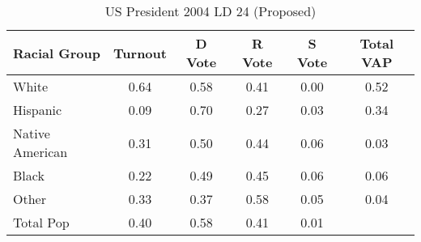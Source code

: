 \begin{table}[htb]
\begin{center}
\caption{US President 2004 LD 24 (Proposed)}
\label{pres04_vap_ld_24}
\begin{tabular}{lccccc}
  \hline
Racial Group & Turnout & D Vote & R Vote & S Vote & Total VAP \\ 
  \hline
White & 0.64 & 0.58 & 0.41 & 0.00 & 0.52 \\ 
  Hispanic & 0.09 & 0.70 & 0.27 & 0.03 & 0.34 \\ 
  Native American & 0.31 & 0.50 & 0.44 & 0.06 & 0.03 \\ 
  Black & 0.22 & 0.49 & 0.45 & 0.06 & 0.06 \\ 
  Other & 0.33 & 0.37 & 0.58 & 0.05 & 0.04 \\ 
  Total Pop & 0.40 & 0.58 & 0.41 & 0.01 &  \\ 
   \hline
\end{tabular}
\end{center}
\end{table}
